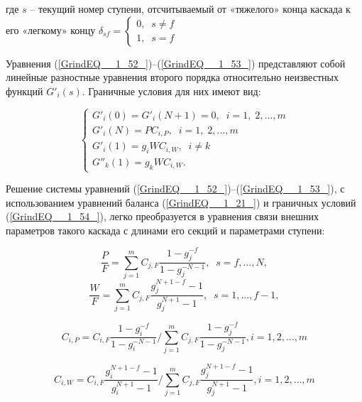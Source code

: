 где $s$ – текущий номер ступени, отсчитываемый от «тяжелого» конца каскада к его «легкому» концу $\delta _{sf} =\left\{\begin{array}{l} {0,\; \; s\ne f} \\ {1,\; \; s=f} \end{array}\right.$

Уравнения (\ref{GrindEQ__1_52_})--(\ref{GrindEQ__1_53_}) представляют собой линейные разностные уравнения второго порядка относительно неизвестных функций $G'_{i} (s)$. Граничные условия для них имеют вид:

\begin{equation} \label{GrindEQ__1_54_} 
  \left\{\begin{array}{l} {G'_{i} (0)=G'_{i} (N+1)=0,\; \; i=1,\; 2,...,m} \\ {G'_{i} (N)=PC_{i,P} ,\; \; i=1,\; 2,...,m} \\ {G'_{i} (1)=g_{i} WC_{i,W} ,\; \; i\ne k} \\ {G''_{k} (1)=g_{k} WC_{i,W} .} \end{array}\right.  
\end{equation} 

Решение системы уравнений (\ref{GrindEQ__1_52_})--(\ref{GrindEQ__1_53_}), с использованием уравнений баланса (\ref{GrindEQ__1_21_}) и граничных условий (\ref{GrindEQ__1_54_}), легко преобразуется в уравнения связи внешних параметров такого каскада с длинами его секций и параметрами ступени:

\begin{equation} \label{GrindEQ__1_55_} 
  \frac{P}{F} =\sum _{j=1}^{m}C_{j,F} \frac{1-g_{j}^{-f} }{1-g_{j}^{-N-1}} ,\; \; s=f,...,N ,                                                  
  \end{equation} 
  \begin{equation} \label{GrindEQ__1_56_} 
  \frac{W}{F} =\sum _{j=1}^{m}C_{j,F} \frac{g_{j}^{N+1-f} -1}{g_{j}^{N+1} -1} ,\; \; s=1,...,f-1 ,                                            
\end{equation}

\begin{equation} \label{GrindEQ__1_57_} 
  C_{i,P}=C_{i,F} \frac{1-g_{i}^{-f}}{1-g_{i}^{-N-1}} / \sum_{j=1}^{m} C_{j,F} \frac{1-g_{j}^{-f}}{1-g_{j}^{-N-1}}, i=1,2, \ldots, m                             
\end{equation}

\begin{equation} \label{GrindEQ__1_58_} 
  C_{i,W}=C_{i,F} \frac{g_{i}^{N+1-f}-1}{g_{i}^{N+1}-1} / \sum_{j=1}^{m} C_{j,F} \frac{g_{j}^{N+1-f}-1}{g_{j}^{N+1}-1}, i=1,2, \ldots, m                         
\end{equation} 

